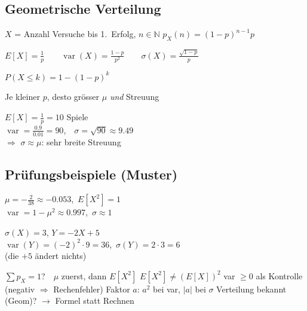 \subsection{Geometrische Verteilung}
\begin{merke}
\begin{itemize}
\pfeil $X$ = Anzahl Versuche bis 1.\ Erfolg, $n\in\mathbb N$
\pfeil $p_X(n)=(1-p)^{n-1}p$
\end{itemize}
\end{merke}
\begin{formel}
$\displaystyle E[X]=\frac1p\qquad
\operatorname{var}(X)=\frac{1-p}{p^2}\qquad
\sigma(X)=\frac{\sqrt{1-p}}{p}$
\end{formel}
\begin{formel}
$\displaystyle P(X\le k)=1-(1-p)^k$
\end{formel}
\begin{itemize}
\pfeil Je kleiner $p$, desto grösser $\mu$ \emph{und} Streuung
\end{itemize}
\begin{bsp}[{{Aufg.\ 3.3.10: Gewinnwahrsch.\ $p=\frac1{10}$}}]
$E[X]=\frac1p=10$ Spiele\\
$\operatorname{var}=\frac{0.9}{0.01}=90$,\ \ $\sigma=\sqrt{90}\approx9.49$\\
$\Rightarrow$ $\sigma\approx\mu$: sehr breite Streuung
\end{bsp}

\subsection{Prüfungsbeispiele (Muster)}
\begin{bsp}[{{Roulette-Gewinn $X\in\{-1,+1\}$, $p=\frac{20}{38},\frac{18}{38}$}}]
$\mu=-\frac{2}{38}\approx-0.053$,\ $E[X^2]=1$\\
$\operatorname{var}=1-\mu^2\approx0.997$,\ $\sigma\approx1$
\end{bsp}
\begin{bsp}
$\sigma(X)=3$, $Y=-2X+5$\\
$\operatorname{var}(Y)=(-2)^2\cdot9=36$,\ $\sigma(Y)=2\cdot3=6$\\
(die $+5$ ändert nichts)
\end{bsp}
\begin{merke}[{{Checkliste}}]
\begin{itemize}
\pfeil $\sum p_X=1$?\ \ $\mu$ zuerst, dann $E[X^2]$
\pfeil $E[X^2]\ne(E[X])^2$
\pfeil var $\ge0$ als Kontrolle (negativ $\Rightarrow$ Rechenfehler)
\pfeil Faktor $a$: $a^2$ bei var, $|a|$ bei $\sigma$
\pfeil Verteilung bekannt (Geom)? $\to$ Formel statt Rechnen
\end{itemize}
\end{merke}
